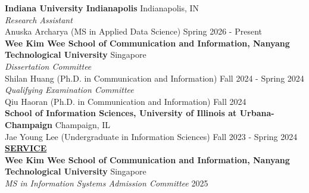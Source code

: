 \documentclass{article}
\begin{document}
\noindent \textbf{Indiana University Indianapolis} \hfill Indianapolis, IN \\
\noindent \textit{Research Assistant} \\
\noindent Anuska Archarya (MS in Applied Data Science) 
\hfill Spring 2026 - Present \\

\noindent \textbf{Wee Kim Wee School of Communication and Information, Nanyang Technological University} \hfill Singapore \\
\noindent \textit{Dissertation Committee} \\ 
\noindent Shilan Huang (Ph.D. in Communication and Information) \hfill Fall 2024 - Spring 2024 \\

\noindent \textit{Qualifying Examination Committee} \\
\noindent Qiu Haoran (Ph.D. in Communication and Information) \hfill Fall 2024 \\

\noindent \textbf{School of Information Sciences, University of Illinois at Urbana-Champaign} \hfill Champaign, IL \\
\noindent Jae Young Lee (Undergraduate in Information Sciences) \hfill Fall 2023 - Spring 2024 \\


\noindent \textbf{\underline{SERVICE}} \\
\noindent \textbf{Wee Kim Wee School of Communication and Information, Nanyang Technological University} \hfill Singapore \\
\noindent \textit{MS in Information Systems Admission Committee} \hfill 2025 \\

\end{document}

